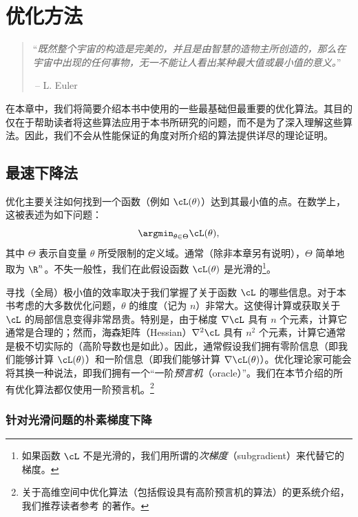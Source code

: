 \documentclass[../../book-main_zh.tex]{subfiles}
\begin{document}
\chapter{优化方法}
\label{app:optimization}

\begin{quote}
    ``{\em 既然整个宇宙的构造是完美的，并且是由智慧的造物主所创造的，那么在宇宙中出现的任何事物，无一不能让人看出某种最大值或最小值的意义。}''

    $~$\hfill -- L. Euler
\end{quote}
\vspace{5mm}

在本章中，我们将简要介绍本书中使用的一些最基础但最重要的优化算法。其目的仅在于帮助读者将这些算法应用于本书所研究的问题，而不是为了深入理解这些算法。因此，我们不会从性能保证的角度对所介绍的算法提供详尽的理论证明。

\section{最速下降法}

优化主要关注如何找到一个函数（例如 \(\cL(\theta)\)）达到其最小值的点。在数学上，这被表述为如下问题：
\begin{equation}
    \argmin_{\theta \in \Theta} \cL(\theta),
\end{equation}
其中 \(\Theta\) 表示自变量 \(\theta\) 所受限制的定义域。通常（除非本章另有说明），\(\Theta\) 简单地取为 \(\R^{n}\)。不失一般性，我们在此假设函数 \(\cL(\theta)\) 是光滑的\footnote{如果函数 \(\cL\) 不是光滑的，我们用所谓的\textit{次梯度}（subgradient）来代替它的梯度。}。

寻找（全局）极小值的效率取决于我们掌握了关于函数 \(\cL\) 的哪些信息。对于本书考虑的大多数优化问题，\(\theta\) 的维度（记为 \(n\)）非常大。这使得计算或获取关于 \(\cL\) 的局部信息变得非常昂贵。特别是，由于梯度 \(\nabla \cL\) 具有 \(n\) 个元素，计算它通常是合理的；然而，海森矩阵（Hessian）\(\nabla^{2} \cL\) 具有 \(n^{2}\) 个元素，计算它通常是极不切实际的（高阶导数也是如此）。因此，通常假设我们拥有零阶信息（即我们能够计算 \(\cL(\theta)\)）和一阶信息（即我们能够计算 \(\nabla \cL(\theta)\)）。优化理论家可能会将其换一种说法，即我们拥有一个“一阶\textit{预言机}（oracle）”。我们在本节介绍的所有优化算法都仅使用一阶预言机。\footnote{关于高维空间中优化算法（包括假设具有高阶预言机的算法）的更系统介绍，我们推荐读者参考 \cite{Wright-Ma-2022} 的著作。}

\subsection{针对光滑问题的朴素梯度下降}
\end{document}
